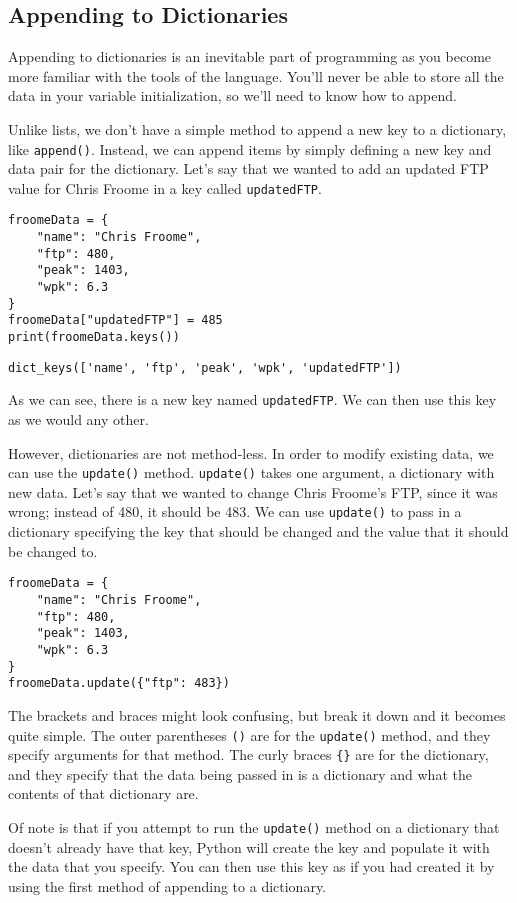 \subsection{Appending to Dictionaries}
Appending to dictionaries is an inevitable part of programming as you become more familiar with the tools of the language. You'll never be able to store all the data in your variable initialization, so we'll need to know how to append.\par
Unlike lists, we don't have a simple method to append a new key to a dictionary, like \verb|append()|. Instead, we can append items by simply defining a new key and data pair for the dictionary. Let's say that we wanted to add an updated FTP value for Chris Froome in a key called \verb|updatedFTP|.
\begin{lstlisting}[style=pippython]
froomeData = {
    "name": "Chris Froome",
    "ftp": 480,
    "peak": 1403,
    "wpk": 6.3
}
froomeData["updatedFTP"] = 485
print(froomeData.keys())
\end{lstlisting}
\begin{lstlisting}[style=none]
dict_keys(['name', 'ftp', 'peak', 'wpk', 'updatedFTP'])
\end{lstlisting}
As we can see, there is a new key named \verb|updatedFTP|. We can then use this key as we would any other.\par
However, dictionaries are not method-less. In order to modify existing data, we can use the \verb|update()| method. \verb|update()| takes one argument, a dictionary with new data. Let's say that we wanted to change Chris Froome's FTP, since it was wrong; instead of 480, it should be 483. We can use \verb|update()| to pass in a dictionary specifying the key that should be changed and the value that it should be changed to.\par
\begin{lstlisting}[style=pippython]
froomeData = {
    "name": "Chris Froome",
    "ftp": 480,
    "peak": 1403,
    "wpk": 6.3
}
froomeData.update({"ftp": 483})
\end{lstlisting}
The brackets and braces might look confusing, but break it down and it becomes quite simple. The outer parentheses \verb|()| are for the \verb|update()| method, and they specify arguments for that method. The curly braces \verb|{}| are for the dictionary, and they specify that the data being passed in is a dictionary and what the contents of that dictionary are.\par
Of note is that if you attempt to run the \verb|update()| method on a dictionary that doesn't already have that key, Python will create the key and populate it with the data that you specify. You can then use this key as if you had created it by using the first method of appending to a dictionary.
